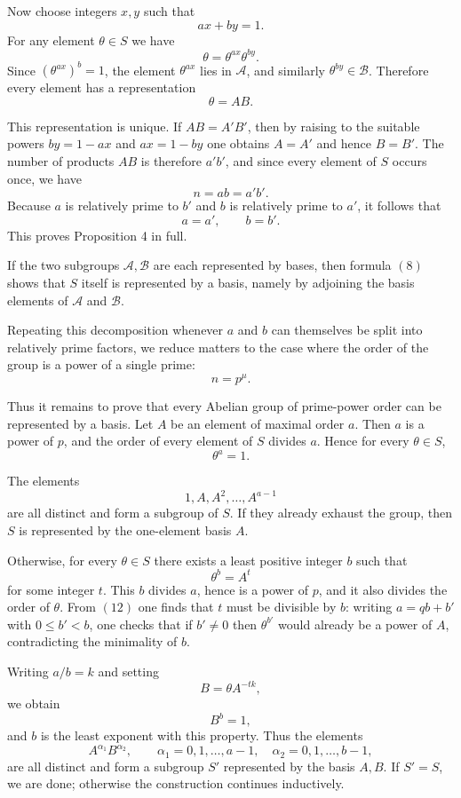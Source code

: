\documentclass[11pt]{article}
\begin{document}
Now choose integers \(x,y\) such that
\[
ax+by=1.
\tag{6}
\]
For any element \(\theta\in S\) we have
\[
\theta=\theta^{ax}\theta^{by}.
\tag{7}
\]
Since \((\theta^{ax})^b=1\), the element \(\theta^{ax}\) lies in \(\mathcal A\), and similarly \(\theta^{by}\in\mathcal B\). Therefore every element has a representation
\[
\theta=AB.
\tag{8}
\]

This representation is unique. If \(AB=A'B'\), then by raising to the suitable powers \(by=1-ax\) and \(ax=1-by\) one obtains \(A=A'\) and hence \(B=B'\). The number of products \(AB\) is therefore \(a'b'\), and since every element of \(S\) occurs once, we have
\[
n=ab=a'b'.
\]
Because \(a\) is relatively prime to \(b'\) and \(b\) is relatively prime to \(a'\), it follows that
\[
a=a',\qquad b=b'.
\]
This proves Proposition 4 in full.

If the two subgroups \(\mathcal A,\mathcal B\) are each represented by bases, then formula \((8)\) shows that \(S\) itself is represented by a basis, namely by adjoining the basis elements of \(\mathcal A\) and \(\mathcal B\).

Repeating this decomposition whenever \(a\) and \(b\) can themselves be split into relatively prime factors, we reduce matters to the case where the order of the group is a power of a single prime:
\[
n=p^\mu.
\tag{9}
\]

Thus it remains to prove that every Abelian group of prime-power order can be represented by a basis. Let \(A\) be an element of maximal order \(a\). Then \(a\) is a power of \(p\), and the order of every element of \(S\) divides \(a\). Hence for every \(\theta\in S\),
\[
\theta^a=1.
\tag{10}
\]

The elements
\[
1,A,A^2,\dots,A^{a-1}
\tag{11}
\]
are all distinct and form a subgroup of \(S\). If they already exhaust the group, then \(S\) is represented by the one-element basis \(A\).

Otherwise, for every \(\theta\in S\) there exists a least positive integer \(b\) such that
\[
\theta^b=A^t
\tag{12}
\]
for some integer \(t\). This \(b\) divides \(a\), hence is a power of \(p\), and it also divides the order of \(\theta\). From \((12)\) one finds that \(t\) must be divisible by \(b\): writing \(a=qb+b'\) with \(0\leq b'<b\), one checks that if \(b'\neq 0\) then \(\theta^{b'}\) would already be a power of \(A\), contradicting the minimality of \(b\).

Writing \(a/b=k\) and setting
\[
B=\theta A^{-tk},
\tag{13}
\]
we obtain
\[
B^b=1,
\tag{14}
\]
and \(b\) is the least exponent with this property. Thus the elements
\[
A^{\alpha_1}B^{\alpha_2},
\qquad
\alpha_1=0,1,\dots,a-1,\quad
\alpha_2=0,1,\dots,b-1,
\tag{15}
\]
are all distinct and form a subgroup \(S'\) represented by the basis \(A,B\). If \(S'=S\), we are done; otherwise the construction continues inductively.
\end{document}
